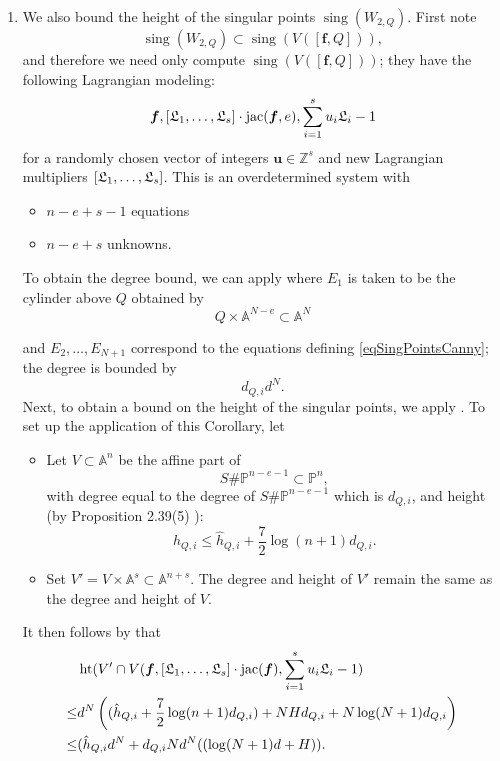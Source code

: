 \documentclass[12pt]{article}
\DeclareMathOperator{\htt}{ht}
\DeclareMathOperator{\sing}{sing}
\DeclareMathOperator{\jac}{jac}
\begin{document}
\begin{itemize}
\begin{enumerate}
\begin{enumerate}
\item 
We also bound the height of the singular points $\sing(W_{2,Q})$. First note \[\sing(W_{2,Q}) \subset \sing(V([\bm f, Q])),\] and therefore we need only compute $\sing(V([\bm f, Q]))$; they have the following Lagrangian modeling:
\begin{equation}\label{eqSingPointsCanny}
    \bm f,[\frak{L}_1,\hdots,\frak{L}_s]\cdot\jac(\bm f,e),\sum_{i=1}^{s}u_i\frak{L}_i-1
\end{equation}
for a randomly chosen vector of integers $\bm  u \in \mathbb{Z}^{s}$ and new Lagrangian multipliers $[\frak{L}_1,\hdots,\frak{L}_s]$. This is an overdetermined system with
%
\begin{itemize}
    \item $n-e+s-1$ equations
    \item $n-e+s$ unknowns.
\end{itemize}
%
To obtain the degree bound, we can apply \cite[Proposition 2.3]{Heintz1980} where $E_1$ is taken to be the cylinder above  $Q$ obtained by 
\[
Q \times \mathbb{A}^{N-e} \subset \mathbb{A}^{N} 
\]


and $E_2,\hdots,E_{N+1}$ correspond to the equations defining \ref{eqSingPointsCanny}; the degree is bounded by 
\[
d_{Q,i}d^N.
\]
Next, to obtain a bound on the height of the singular points, we apply \cite[Corollary 2.10]{SharpEstimatesForTheEffectiveN}. To set up the application of this Corollary, let
\begin{itemize}
    \item Let $V\subset \mathbb{A}^n$ be the affine part of \[S \# \mathbb{P}^{n-e-1} \subset \mathbb{P}^n,\] with degree equal to the degree of $S\# \mathbb{P}^{n-e-1}$ which is $d_{Q,i}$, and height (by Proposition 2.39(5) \cite{EN}):\[h_{Q,i} \leq \hat{h}_{Q,i} + \frac{7}{2}\log(n+1)d_{Q,i}.\]
    \item Set $V' = V \times \mathbb{{A}}^s\subset \mathbb{A}^{n+s}$. The degree and height of $V'$ remain the same as the degree and height of $V$.
\end{itemize}
%
It then follows by \cite[Corollary 2.10]{SharpEstimatesForTheEffectiveN} that 
\begin{align*}
&\htt(V' \cap V(\bm f,[\frak{L}_1,\hdots,\frak{L}_s]\cdot\jac(\bm f),\sum_{i=1}^{s}u_i\frak{L}_i-1)\\
\leq& d^N\left((\hat{h}_{Q,i} + \frac{7}{2}\log(n+1)d_{Q,i}) + NHd_{Q,i} + N\log(N+1)d_{Q,i} \right)\\
\leq& (\hat{h}_{Q,i}d^{N} + d_{Q,i} Nd^{N}((\log(N+1)d + H)).
\end{align*}




\end{enumerate}
\end{enumerate}
\end{itemize}
\end{document}
